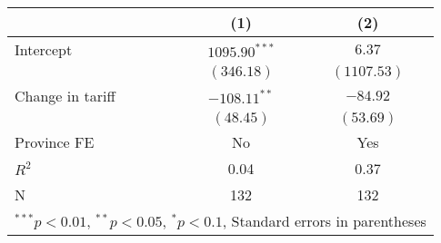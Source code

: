 
\begin{tabular}{l c c }
\hline
 & (1) & (2) \\
\hline
Intercept & $1095.90^{***}$ & $6.37$      \\
            & $(346.18)$      & $(1107.53)$ \\
Change in tariff     & $-108.11^{**}$  & $-84.92$    \\
            & $(48.45)$       & $(53.69)$   \\
\hline
Province FE          & No               & Yes               \\ 
\hline
$R^2$       & 0.04            & 0.37        \\
N           & 132             & 132         \\
\hline
\multicolumn{3}{l}{\scriptsize{$^{***}p<0.01$, $^{**}p<0.05$, $^*p<0.1$, Standard errors in parentheses}}
\end{tabular}
